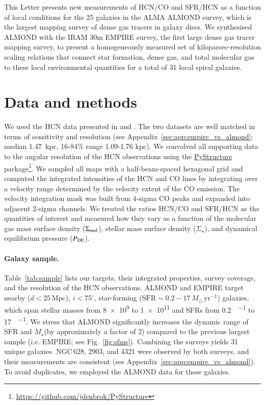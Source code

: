 \documentclass[letter, longauth]{aa} %
\newcommand*{\mstar}{\ensuremath{M_{\star}}\xspace}  %
\begin{document}
This Letter presents new measurements of HCN/CO and SFR/HCN as a function of local conditions for the 25 galaxies in the ALMA ALMOND survey, which is the largest mapping survey of dense gas tracers in galaxy discs. 
We synthesised ALMOND with the IRAM 30m EMPIRE survey, the first large dense gas tracer mapping survey, to present a homogeneously measured set of kiloparsec-resolution scaling relations that connect star formation, dense gas, and total molecular gas to these local environmental quantities for a total of 31 local spiral galaxies. 

\section{Data and methods}
\label{sec:data}
We used the HCN data presented in \citet[][EMPIRE]{Jimenez-Donaire2019} and \citet[][ALMOND]{Neumann2023a}.
The two datasets are well matched in terms of sensitivity and resolution (see Appendix~\ref{sec:app:empire_vs_almond}; median 1.47~kpc, 16{-}84\% range 1.09{-}1.76 kpc). 
We convolved all supporting data to the angular resolution of the HCN observations using the \href{https://zenodo.org/records/13787728}{PyStructure} package\footnote{\url{https://github.com/jdenbrok/PyStructure}}. 
We sampled all maps with a half-beam-spaced hexagonal grid and computed the integrated intensities of the HCN and CO lines by integrating over a velocity range determined by the velocity extent of the CO emission. 
The velocity integration mask was built from 4-sigma CO peaks and expanded into adjacent 2-sigma channels.
We treated the ratios HCN/CO and SFR/HCN as the quantities of interest and measured how they vary as a function of the molecular gas mass surface density ($\Sigma_{\rm mol}$), stellar mass surface density ($\Sigma_\star$), and dynamical equilibrium pressure ($P_{\rm DE}$).

\paragraph{Galaxy sample.} 

Table~\ref{tab:sample} lists our targets, their integrated properties, survey coverage, and the resolution of the HCN observations. 
ALMOND and EMPIRE target nearby ($d<25\,\mathrm{Mpc}$), $i<75^\circ$, star-forming ($\mathrm{SFR}\sim0.2-17\,M_\odot\,\mathrm{yr}^{-1}$) galaxies, which span stellar masses from \SI{8e9}{\msun} to \SI{1e11}{\msun} and SFRs from \SI{0.2}{\msun\per\year} to \SI{17}{\msun\per\year}.
We stress that ALMOND significantly increases the dynamic range of SFR and \mstar (by approximately a factor of 2) compared to the previous largest sample (i.e. EMPIRE; see Fig.~\ref{fig:sfms}).
Combining the surveys yields 31 unique galaxies.
NGC\,628, 2903, and 4321 were observed by both surveys, and their measurements are consistent (see Appendix~\ref{sec:app:empire_vs_almond}). 
To avoid duplicates, we employed the ALMOND data for these galaxies.
\end{document}
